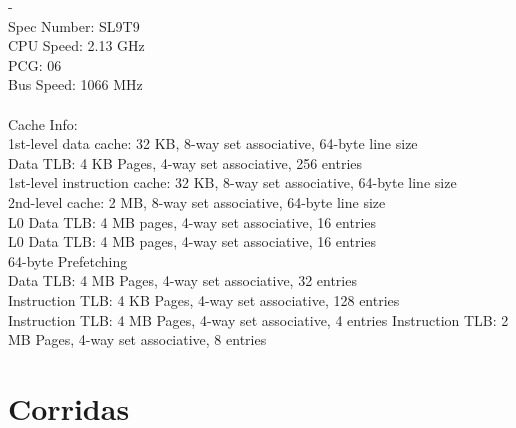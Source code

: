 \documentclass[a4paper,10pt]{article}
\begin{document}
-\\
Spec Number: SL9T9\\
CPU Speed: 2.13 GHz\\
PCG: 06\\
Bus Speed: 1066 MHz\\
\\
Cache Info:\\
        1st-level data cache: 32 KB, 8-way set associative, 64-byte line size\\
        Data TLB: 4 KB Pages, 4-way set associative, 256 entries\\
        1st-level instruction cache: 32 KB, 8-way set associative, 64-byte line size\\
        2nd-level cache: 2 MB, 8-way set associative, 64-byte line size\\
        L0 Data TLB: 4 MB pages, 4-way set associative, 16 entries\\
        L0 Data TLB: 4 MB pages, 4-way set associative, 16 entries\\
        64-byte Prefetching\\
        Data TLB: 4 MB Pages, 4-way set associative, 32 entries\\
        Instruction TLB: 4 KB Pages, 4-way set associative, 128 entries\\
        Instruction TLB: 4 MB Pages, 4-way set associative, 4 entries Instruction TLB: 2 MB Pages, 4-way set associative, 8 entries\\



\clearpage
\section{Corridas}


%
%
%
%
%

%
\end{document}
